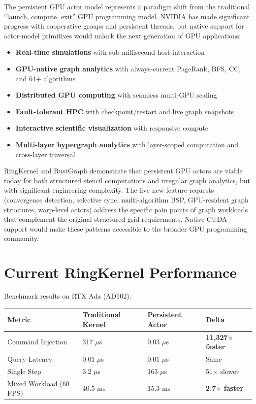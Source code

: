 \documentclass[11pt,a4paper]{article}
\begin{document}
The persistent GPU actor model represents a paradigm shift from the traditional ``launch, compute, exit'' GPU programming model. NVIDIA has made significant progress with cooperative groups and persistent threads, but native support for actor-model primitives would unlock the next generation of GPU applications:

\begin{itemize}[leftmargin=*]
    \item \textbf{Real-time simulations} with sub-millisecond host interaction
    \item \textbf{GPU-native graph analytics} with always-current PageRank, BFS, CC, and 64+ algorithms
    \item \textbf{Distributed GPU computing} with seamless multi-GPU scaling
    \item \textbf{Fault-tolerant HPC} with checkpoint/restart and live graph snapshots
    \item \textbf{Interactive scientific visualization} with responsive compute
    \item \textbf{Multi-layer hypergraph analytics} with layer-scoped computation and cross-layer traversal
\end{itemize}

RingKernel and RustGraph demonstrate that persistent GPU actors are viable today for both structured stencil computations and irregular graph analytics, but with significant engineering complexity. The five new feature requests (convergence detection, selective sync, multi-algorithm BSP, GPU-resident graph structures, warp-level actors) address the specific pain points of graph workloads that complement the original structured-grid requirements. Native CUDA support would make these patterns accessible to the broader GPU programming community.

\newpage

\appendix
\section{Current RingKernel Performance}

Benchmark results on RTX Ada (AD102):

\begin{table}[h]
\centering
\begin{tabular}{@{}llll@{}}
\toprule
\textbf{Metric} & \textbf{Traditional Kernel} & \textbf{Persistent Actor} & \textbf{Delta} \\
\midrule
Command Injection & 317 $\mu$s & 0.03 $\mu$s & \textbf{11,327$\times$ faster} \\
Query Latency & 0.01 $\mu$s & 0.01 $\mu$s & Same \\
Single Step & 3.2 $\mu$s & 163 $\mu$s & 51$\times$ slower \\
Mixed Workload (60 FPS) & 40.5 ms & 15.3 ms & \textbf{2.7$\times$ faster} \\
\bottomrule
\end{tabular}
\end{table}
\end{document}
